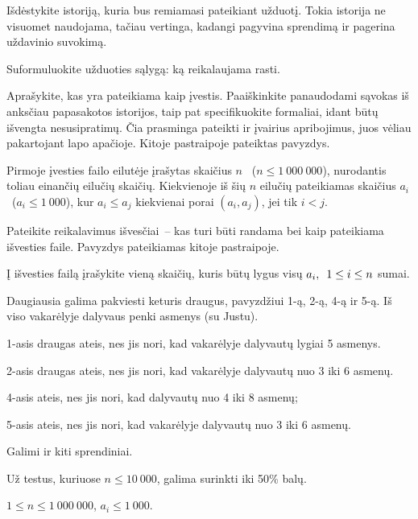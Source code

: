 \documentclass{liostyle}
\newcommand{\maxN}{1\ 000\ 000}
\newcommand{\maxA}{1\ 000}
\begin{document}
Išdėstykite istoriją, kuria bus remiamasi pateikiant užduotį. Tokia
istorija ne visuomet naudojama, tačiau vertinga, kadangi pagyvina
sprendimą ir pagerina uždavinio suvokimą.

\Task
Suformuluokite užduoties sąlygą: ką reikalaujama rasti.

\Input
Aprašykite, kas yra pateikiama kaip įvestis. Paaiškinkite panaudodami
sąvokas iš anksčiau papasakotos istorijos, taip pat specifikuokite
formaliai, idant būtų išvengta nesusipratimų. Čia prasminga pateikti
ir įvairius apribojimus, juos vėliau pakartojant lapo apačioje. Kitoje
pastraipoje pateiktas pavyzdys.

Pirmoje įvesties failo eilutėje įrašytas skaičius $n$~%
($n\le\maxN$), nurodantis toliau einančių eilučių skaičių.
Kiekvienoje iš šių $n$ eilučių pateikiamas skaičius $a_i$~($a_i\le\maxA$),
kur $a_i\le a_j$ kiekvienai porai $(a_i, a_j)$, jei tik $i<j$.

\Output
Pateikite reikalavimus išvesčiai~-- kas turi būti randama bei kaip
pateikiama išvesties faile. Pavyzdys pateikiamas kitoje pastraipoje.

Į išvesties failą įrašykite vieną skaičių, kuris būtų lygus
visų $a_i,\enskip 1\le i\le n$ sumai.

\Examples
\example%
{}%
{}%
{
Daugiausia galima pakviesti keturis draugus,
pavyzdžiui 1-ą, 2-ą, 4-ą ir 5-ą. Iš
viso vakarėlyje dalyvaus penki asmenys (su
Justu).

1-asis draugas ateis, nes jis nori, kad
vakarėlyje dalyvautų lygiai 5 asmenys. 

2-asis draugas ateis, nes jis nori, kad
vakarėlyje dalyvautų nuo 3 iki 6 asmenų. 

4-asis ateis, nes jis nori, kad dalyvautų nuo
4 iki 8 asmenų;

5-asis ateis, nes jis nori, kad vakarėlyje
dalyvautų nuo 3 iki 6 asmenų.

Galimi ir kiti sprendiniai.
}

\Grading
Už testus, kuriuose $n \le 10\ 000$, galima surinkti iki 50\% balų.

\Constraints
$1\le n \le \maxN$,\enskip
$a_i\le\maxA$.
\end{document}
